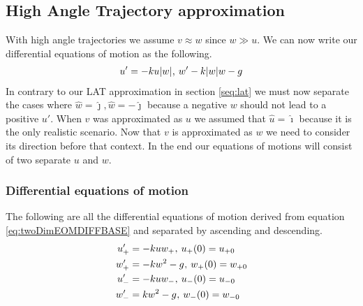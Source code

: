 \documentclass[%
aip,
jmp,
amsmath,amssymb,
reprint,%
]{revtex4-1}
\newcommand{\comma}{\hspace{0.1mm},\hspace{0.7mm}}
\begin{document}
	\subsection{High Angle Trajectory approximation}\label{seq:hat}
	With high angle trajectories we assume $v \approx w$ since $w \gg u$. We can now write our differential equations of motion as the following.
	\begin{align}\label{eq:twoDimEOMDIFFBASE}
		u' = -ku|w| \comma w' -k|w|w-g
	\end{align}
	In contrary to our LAT approximation in section \ref{seq:lat} we must now separate the cases where $\hat{w} = \hat{\jmath}, \hat{w} = -\hat{\jmath}$ because a negative $w$ should not lead to a positive $u'$. When $v$ was approximated as $u$ we assumed that $\hat{u} = \hat{\imath}$ because it is the only realistic scenario. Now that $v$ is approximated as $w$ we need to consider its direction before that context. In the end our equations of motions will consist of two separate $u$ and $w$.
	\subsubsection{Differential equations of motion}
	The following are all the differential equations of motion derived from equation \eqref{eq:twoDimEOMDIFFBASE} and separated by ascending and descending.
	\begin{align}\label{eq:twoDimEOMHATUP}
		u_{+}' &= -kuw_+ \comma u_+(0) = u_{+0}\\\label{eq:twoDimEOMHATWP}
		w_{+}' &= -kw^2 -g \comma w_+(0) = w_{+0}\\\label{eq:twoDimEOMHATUM}
		u_{-}' &= -kuw_- \comma u_-(0) = u_{-0}\\\label{eq:twoDimEOMHATWM}
		w_{-}' &=  kw^2 -g \comma w_-(0) = w_{-0}
	\end{align}
\end{document}
